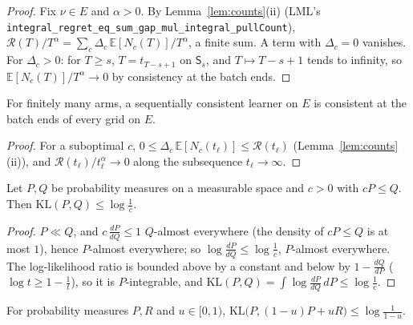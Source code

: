 \documentclass[11pt]{article}
\newcommand{\E}{\mathbb{E}}
\newcommand{\Sq}{\mathsf S}
\newcommand{\KL}{\mathrm{KL}}
\begin{document}
\begin{proof}
Fix $\nu\in E$ and $\alpha>0$. By Lemma~\ref{lem:counts}(ii) (LML's
\texttt{integral\_regret\_eq\_sum\_gap\_mul\_integral\_pullCount}),
$\mathcal R(T)/T^\alpha=\sum_c\Delta_c\,\E[N_c(T)]/T^\alpha$, a finite sum. A term with
$\Delta_c=0$ vanishes. For $\Delta_c>0$: for $T\ge s$, $T=t_{T-s+1}$ on $\Sq_s$, and
$T\mapsto T-s+1$ tends to infinity, so $\E[N_c(T)]/T^\alpha\to0$ by consistency at the batch ends.
\end{proof}

\begin{lemma}\label{flem:ends-of-seq}
For finitely many arms, a sequentially consistent learner on $E$ is consistent at the batch ends of
every grid on $E$.
\end{lemma}

\begin{proof}
For a suboptimal $c$, $0\le\Delta_c\,\E[N_c(t_\ell)]\le\mathcal R(t_\ell)$
(Lemma~\ref{lem:counts}(ii)), and $\mathcal R(t_\ell)/t_\ell^\alpha\to0$ along the subsequence
$t_\ell\to\infty$.
\end{proof}

\begin{lemma}\label{flem:kl-density}
Let $P,Q$ be probability measures on a measurable space and $c>0$ with $cP\le Q$. Then
$\KL(P,Q)\le\log\frac1c$.
\end{lemma}

\begin{proof}
$P\ll Q$, and $c\,\frac{dP}{dQ}\le1$ $Q$-almost everywhere (the density of $cP\le Q$ is at most
$1$), hence $P$-almost everywhere; so $\log\frac{dP}{dQ}\le\log\frac1c$, $P$-almost everywhere.
The log-likelihood ratio is bounded above by a constant and below by $1-\frac{dQ}{dP}$
($\log t\ge1-\frac1t$), so it is $P$-integrable, and
$\KL(P,Q)=\int\log\frac{dP}{dQ}\,dP\le\log\frac1c$.
\end{proof}

\begin{lemma}\label{flem:kl-mixture}
For probability measures $P,R$ and $u\in[0,1)$, $\KL\big(P,(1-u)P+uR\big)\le\log\frac1{1-u}$.
\end{lemma}
\end{document}
